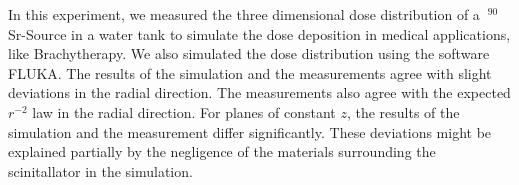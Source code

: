 \documentclass[a4paper,parskip]{scrartcl}
\begin{document}
In this experiment, we measured the three dimensional dose distribution of a $~^ {90}$Sr-Source in a water tank to simulate the dose deposition in medical applications, like Brachytherapy. We also simulated the dose distribution using the software FLUKA. The results of the simulation and the measurements agree with slight deviations in the radial direction. The measurements also agree with the expected $r^ {-2}$ law in the radial direction.  For planes of constant $z$, the results of the simulation and the measurement differ significantly. These deviations might be explained partially by the negligence of the materials surrounding the scinitallator in the simulation. 

\newpage


\end{document}
